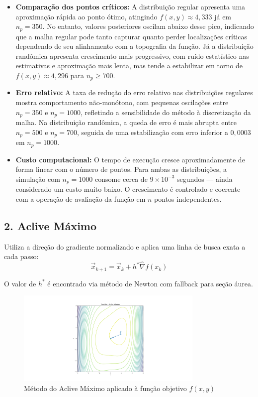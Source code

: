 \documentclass[12pt]{article}
\begin{document}
\begin{itemize}
    \item \textbf{Comparação dos pontos críticos:}  A distribuição regular apresenta uma aproximação rápida ao ponto ótimo, atingindo $f(x,y) \approx 4{,}333$ já em $n_p=350$. No entanto, valores posteriores oscilam abaixo desse pico, indicando que a malha regular pode tanto capturar quanto perder localizações críticas dependendo de seu alinhamento com a topografia da função. Já a distribuição randômica apresenta crescimento mais progressivo, com ruído estatístico nas estimativas e aproximação mais lenta, mas tende a estabilizar em torno de $f(x,y) \approx 4{,}296$ para $n_p \geq 700$.

    \item \textbf{Erro relativo:} A taxa de redução do erro relativo nas distribuições regulares mostra comportamento não-monótono, com pequenas oscilações entre $n_p=350$ e $n_p=1000$, refletindo a sensibilidade do método à discretização da malha. Na distribuição randômica, a queda de erro é mais abrupta entre $n_p=500$ e $n_p=700$, seguida de uma estabilização com erro inferior a $0{,}0003$ em $n_p=1000$.

    \item \textbf{Custo computacional:} O tempo de execução cresce aproximadamente de forma linear com o número de pontos. Para ambas as distribuições, a simulação com $n_p=1000$ consome cerca de $9 \times 10^{-3}$ segundos — ainda considerado um custo muito baixo. O crescimento é controlado e coerente com a operação de avaliação da função em $n$ pontos independentes.
\end{itemize}

\subsection*{2. Aclive Máximo}

Utiliza a direção do gradiente normalizado e aplica uma linha de busca exata a cada passo:
\begin{equation}
    \vec{x}_{k+1} = \vec{x}_k + h^* \hat{\nabla} f(x_k)
\end{equation}

O valor de $h^*$ é encontrado via método de Newton com fallback para seção áurea.

\begin{figure}[H]
    \centering
    \includegraphics[width=0.8\textwidth]{img/AM.png}
    \caption{Método do Aclive Máximo aplicado à função objetivo $f(x, y)$}
    \label{fig:aclive_maximo}
\end{figure}
\end{document}
